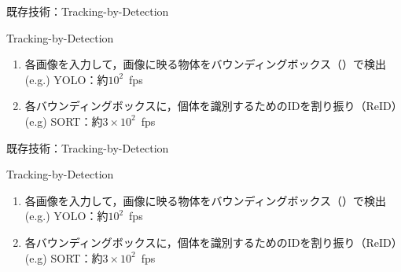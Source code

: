 \begin{frame}{既存技術：Tracking-by-Detection}
    \begin{block}{Tracking-by-Detection \cite{luo2021multiple}}
        \begin{enumerate}
            \item 各画像を入力して，画像に映る物体をバウンディングボックス（\red{$\square$}）で検出
            \\\ra (e.g.) YOLO：約$10^2$\ fps \cite{redmon2016you,wang2024yolov10}
            \item 各バウンディングボックスに，個体を識別するためのIDを割り振り（ReID）
            \\\ra (e.g) SORT：約$3\times10^2$\ fps \cite{bewley2016simple,du2023strongsort}
        \end{enumerate}        
    \end{block}
    \vs
\end{frame}
\begin{frame}{既存技術：Tracking-by-Detection}
    \begin{block}{Tracking-by-Detection \cite{luo2021multiple}}
        \begin{enumerate}
            \item 各画像を入力して，画像に映る物体をバウンディングボックス（\red{$\square$}）で検出
            \\\ra (e.g.) YOLO：約$10^2$\ fps \cite{redmon2016you,wang2024yolov10}
            \item 各バウンディングボックスに，個体を識別するためのIDを割り振り（ReID）
            \\\ra (e.g) SORT：約$3\times10^2$\ fps \cite{bewley2016simple,du2023strongsort}
        \end{enumerate}        
    \end{block}
    \vs
\end{frame}

